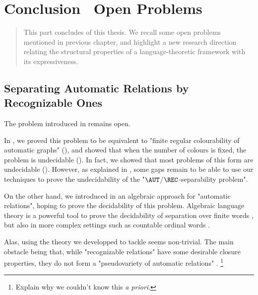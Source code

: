 \chapter{Conclusion \fancyand~Open Problems}
\label{ch:conclu-automatic}

\begin{chapterpresentation}
	\begin{abstract}
		This part concludes  of this thesis.
		We recall some open problems mentioned in previous chapter,
		and highlight a new research direction relating the
		structural properties of a language-theoretic framework
		with its expressiveness.
	\end{abstract}
	\chaptertoc
\end{chapterpresentation}

\section{Separating Automatic Relations by Recognizable Ones}

The problem introduced in 
remains open.

\openProblemAutRecSeparability*

In , we proved this problem to be equivalent
to "finite regular colourability of automatic graphs" (),
and showed that when the number of colours is fixed, the problem is undecidable
().
In fact, we showed that most problems of this form are undecidable
().
However, as explained in , some gaps remain to be able to use
our techniques to prove the undecidability of the "$\AUT$/$\REC$-separability problem".

On the other hand, we introduced in  an algebraic approach for
"automatic relations", hoping to prove the decidability of this problem.
Algebraic language theory is a powerful tool to prove the decidability of separation
over finite words \cite{PlaceZeitoun2016SeparatingRegularLanguages},
but also in more complex settings such as countable ordinal words \cite{ColcombetGoolMorvan2022FOSeparation}.

Alas, using the theory we developped to tackle 
seems non-trivial. The main obstacle being that, while
"recognizable relations" have some desirable closure properties,
they do not form a "pseudovariety of automatic relations"
.%
\footnote{Explain why we couldn't know this \emph{a priori}.}

